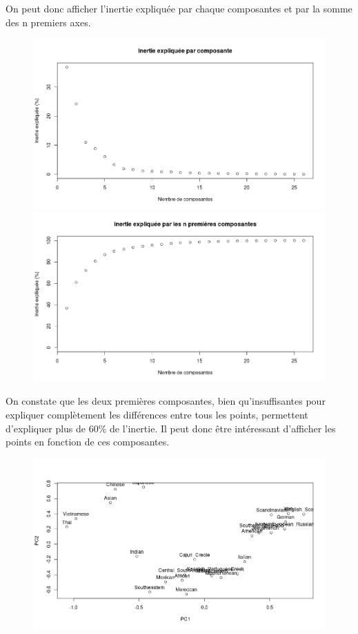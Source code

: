 \documentclass[a4paper, titlepage]{report}
\begin{document}
\newpage
On peut donc afficher l'inertie expliquée par chaque composantes et par la somme des n premiers axes.
\begin{figure}[h]
	\begin{center}
		\includegraphics[scale = 0.32]{./doc/plot-inertie-par-composantes.png}
		\includegraphics[scale = 0.32]{./doc/plot-inertie-n-composantes.png}
	\end{center}
\end{figure}

On constate que les deux premières composantes, bien qu'insuffisantes pour expliquer complètement les différences entre tous les points, permettent d'expliquer plus de 60\% de l'inertie. Il peut donc être intéressant d'afficher les points en fonction de ces composantes.
\begin{figure}[h]
	\begin{center}
		\includegraphics[scale = 0.32]{./doc/plot-recettes-composantes-1-2.png}
	\end{center}
\end{figure}
\end{document}

